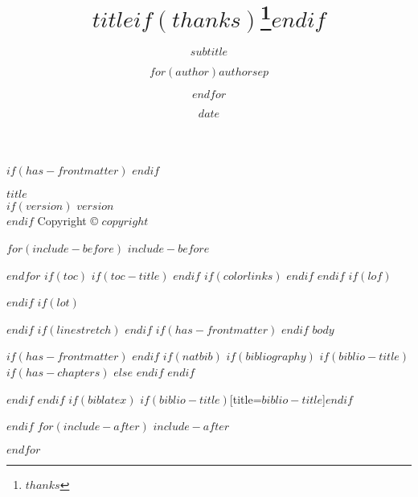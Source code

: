 \documentclass[
$if(fontsize)$
  $fontsize$,
$endif$
$if(papersize)$
  $papersize$paper,
$endif$
$for(classoption)$
  $classoption$$sep$,
$endfor$
]{$documentclass$}
\title{$title$$if(thanks)$\thanks{$thanks$}$endif$}
\subtitle{$subtitle$}
\author{$for(author)$$author$$sep$ \and $endfor$}
\date{$date$}
\begin{document}
$if(has-frontmatter)$
\frontmatter
$endif$

% 
% 
\begin{titlepage}
  \centering
  \vspace*{10cm}
  {\huge \textbf{$title$}}\\[0.5cm]
  $if(version)$
      {\Large \textit{$version$}}\\
  $endif$
  \vfill
  {\small Copyright \copyright{} $copyright$}\\[0.5cm]
\end{titlepage}

\newpage

$for(include-before)$
$include-before$

$endfor$
$if(toc)$
$if(toc-title)$
\renewcommand*\contentsname{$toc-title$}
$endif$
{
$if(colorlinks)$
\hypersetup{linkcolor=$if(toccolor)$$toccolor$$else$$endif$}
$endif$
\setcounter{tocdepth}{$toc-depth$}
\tableofcontents
}
$endif$
$if(lof)$
\listoffigures
$endif$
$if(lot)$
\listoftables
$endif$
$if(linestretch)$
$endif$
$if(has-frontmatter)$
\mainmatter
$endif$
$body$

$if(has-frontmatter)$
\backmatter
$endif$
$if(natbib)$
$if(bibliography)$
$if(biblio-title)$
$if(has-chapters)$
\renewcommand\bibname{$biblio-title$}
$else$
\renewcommand\refname{$biblio-title$}
$endif$
$endif$


$endif$
$endif$
$if(biblatex)$
\printbibliography$if(biblio-title)$[title=$biblio-title$]$endif$

$endif$
$for(include-after)$
$include-after$

$endfor$
\end{document}
